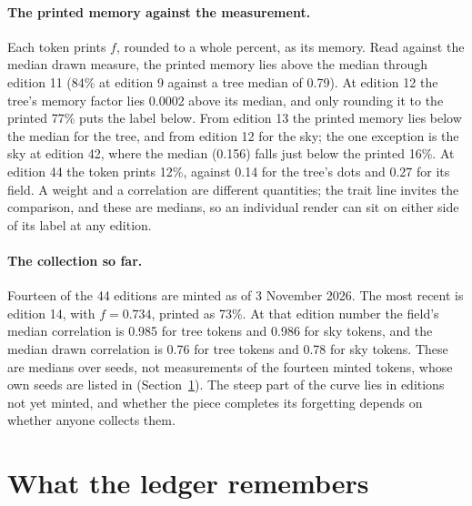 \documentclass[11pt]{article}
\begin{document}
\paragraph{The printed memory against the measurement.} Each token prints $f$, rounded to a whole percent, as its memory. Read against the median drawn measure, the printed memory lies above the median through edition 11 (84\% at edition 9 against a tree median of 0.79). At edition 12 the tree's memory factor lies 0.0002 above its median, and only rounding it to the printed 77\% puts the label below. From edition 13 the printed memory lies below the median for the tree, and from edition 12 for the sky; the one exception is the sky at edition 42, where the median (0.156) falls just below the printed 16\%. At edition 44 the token prints 12\%, against 0.14 for the tree's dots and 0.27 for its field. A weight and a correlation are different quantities; the trait line invites the comparison, and these are medians, so an individual render can sit on either side of its label at any edition.

\paragraph{The collection so far.} Fourteen of the 44 editions are minted as of 3 November 2026. The most recent is edition 14, with $f = 0.734$, printed as 73\%. At that edition number the field's median correlation is 0.985 for tree tokens and 0.986 for sky tokens, and the median drawn correlation is 0.76 for tree tokens and 0.78 for sky tokens. These are medians over seeds, not measurements of the fourteen minted tokens, whose own seeds are listed in  (Section~\ref{sec:ledger}). The steep part of the curve lies in editions not yet minted, and whether the piece completes its forgetting depends on whether anyone collects them.

\section{What the ledger remembers}
\label{sec:ledger}
\end{document}
